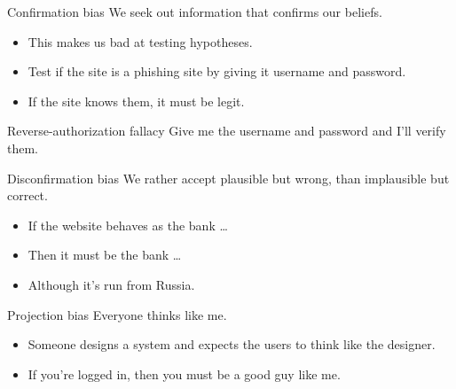 \documentclass{beamer}
\begin{document}
\begin{frame}
  \begin{block}{Confirmation bias}
    We seek out information that confirms our beliefs.
  \end{block}

  \pause{}

  \begin{example}
    \begin{itemize}
      \item This makes us bad at testing hypotheses.
      \item Test if the site is a phishing site by giving it username and 
        password.
      \item If the site knows them, it must be legit.
    \end{itemize}
  \end{example}

  \pause{}

  \begin{block}{Reverse-authorization fallacy}
    Give me the username and password and I'll verify them.
  \end{block}
\end{frame}

\begin{frame}
  \begin{block}{Disconfirmation bias}
    We rather accept plausible but wrong, than implausible but correct.
  \end{block}

  \pause{}

  \begin{example}
    \begin{itemize}
      \item If the website behaves as the bank \dots
      \item Then it must be the bank \dots
      \item Although it's run from Russia.
    \end{itemize}
  \end{example}
\end{frame}

\begin{frame}
  \begin{block}{Projection bias}
    Everyone thinks like me.
  \end{block}

  \begin{example}
    \begin{itemize}
      \item Someone designs a system and expects the users to think like the 
        designer.
      \item If you're logged in, then you must be a good guy like me.
    \end{itemize}
  \end{example}
\end{frame}
\end{document}
